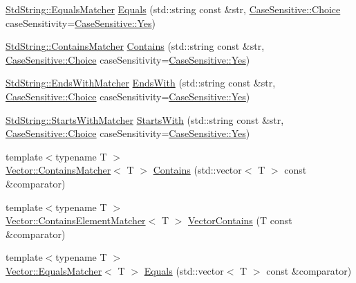 \begin{DoxyCompactItemize}
\item 
\hyperlink{structCatch_1_1Matchers_1_1StdString_1_1EqualsMatcher}{Std\-String\-::\-Equals\-Matcher} \hyperlink{namespaceCatch_1_1Matchers_af8af7dfc338335ed4c788cb1b37fc59f}{Equals} (std\-::string const \&str, \hyperlink{structCatch_1_1CaseSensitive_aad49d3aee2d97066642fffa919685c6a}{Case\-Sensitive\-::\-Choice} case\-Sensitivity=\hyperlink{structCatch_1_1CaseSensitive_aad49d3aee2d97066642fffa919685c6aa7c5550b69ec3c502e6f609b67f9613c6}{Case\-Sensitive\-::\-Yes})
\item 
\hyperlink{structCatch_1_1Matchers_1_1StdString_1_1ContainsMatcher}{Std\-String\-::\-Contains\-Matcher} \hyperlink{namespaceCatch_1_1Matchers_a1f6c2accdc6cd75a84d7112dcad647b4}{Contains} (std\-::string const \&str, \hyperlink{structCatch_1_1CaseSensitive_aad49d3aee2d97066642fffa919685c6a}{Case\-Sensitive\-::\-Choice} case\-Sensitivity=\hyperlink{structCatch_1_1CaseSensitive_aad49d3aee2d97066642fffa919685c6aa7c5550b69ec3c502e6f609b67f9613c6}{Case\-Sensitive\-::\-Yes})
\item 
\hyperlink{structCatch_1_1Matchers_1_1StdString_1_1EndsWithMatcher}{Std\-String\-::\-Ends\-With\-Matcher} \hyperlink{namespaceCatch_1_1Matchers_ae5a45efb4538c57c43e04f3f9043ad6e}{Ends\-With} (std\-::string const \&str, \hyperlink{structCatch_1_1CaseSensitive_aad49d3aee2d97066642fffa919685c6a}{Case\-Sensitive\-::\-Choice} case\-Sensitivity=\hyperlink{structCatch_1_1CaseSensitive_aad49d3aee2d97066642fffa919685c6aa7c5550b69ec3c502e6f609b67f9613c6}{Case\-Sensitive\-::\-Yes})
\item 
\hyperlink{structCatch_1_1Matchers_1_1StdString_1_1StartsWithMatcher}{Std\-String\-::\-Starts\-With\-Matcher} \hyperlink{namespaceCatch_1_1Matchers_a97c9ee09a70378ca7e8c6f9f01b0d6d1}{Starts\-With} (std\-::string const \&str, \hyperlink{structCatch_1_1CaseSensitive_aad49d3aee2d97066642fffa919685c6a}{Case\-Sensitive\-::\-Choice} case\-Sensitivity=\hyperlink{structCatch_1_1CaseSensitive_aad49d3aee2d97066642fffa919685c6aa7c5550b69ec3c502e6f609b67f9613c6}{Case\-Sensitive\-::\-Yes})
\item 
{\footnotesize template$<$typename T $>$ }\\\hyperlink{structCatch_1_1Matchers_1_1Vector_1_1ContainsMatcher}{Vector\-::\-Contains\-Matcher}$<$ T $>$ \hyperlink{namespaceCatch_1_1Matchers_a4b3621740dc515216ad31ab827d4092c}{Contains} (std\-::vector$<$ T $>$ const \&comparator)
\item 
{\footnotesize template$<$typename T $>$ }\\\hyperlink{structCatch_1_1Matchers_1_1Vector_1_1ContainsElementMatcher}{Vector\-::\-Contains\-Element\-Matcher}$<$ T $>$ \hyperlink{namespaceCatch_1_1Matchers_ae8db5846328116fb36386893deaec944}{Vector\-Contains} (T const \&comparator)
\item 
{\footnotesize template$<$typename T $>$ }\\\hyperlink{structCatch_1_1Matchers_1_1Vector_1_1EqualsMatcher}{Vector\-::\-Equals\-Matcher}$<$ T $>$ \hyperlink{namespaceCatch_1_1Matchers_a332a401fb0da33c988e9cfa400ecce1b}{Equals} (std\-::vector$<$ T $>$ const \&comparator)
\end{DoxyCompactItemize}


